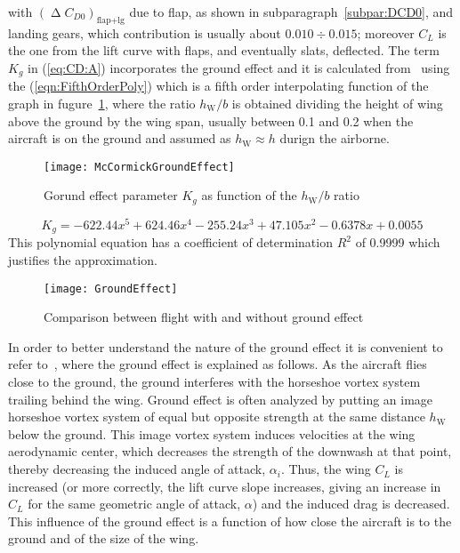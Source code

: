%
with $\left(\upDelta C_{D0}\right)_{\text{flap}+\text{lg}}$ due to flap, as shown in subparagraph~\ref{subpar:DCD0}, and landing gears, which contribution is usually about $0.010 \div 0.015$; moreover $C_L$ is the one from the lift curve with flaps, and eventually slats, deflected. The term $K_g$ in (\ref{eq:CD:A}) incorporates the ground effect and it is calculated from~\cite{McCormick} using the (\ref{eqn:FifthOrderPoly}) which is a fifth order interpolating function of the  graph in fugure~\ref{fig:McCormickGroundEffect}, where the ratio $h_{\text{W}}/b$ is obtained dividing the height of wing above the ground by the wing span, usually between 0.1 and 0.2 when the aircraft is on the ground and assumed as $h_{\text{W}} \approx h$ durign the airborne.
%
\begin{figure}[H]
\centering
\texttt{[image: McCormickGroundEffect]}
\caption{Gorund effect parameter $K_g$ as function of the $h_{\text{W}}/b$ ratio}
\label{fig:McCormickGroundEffect}
\end{figure}
%
\begin{equation}
K_g=-622.44x^5+624.46x^4-255.24x^3+47.105x^2-0.6378x+0.0055
\label{eqn:FifthOrderPoly}
\end{equation}
%
This polynomial equation has a coefficient of determination $R^2$ of 0.9999 which justifies the approximation.
%
\begin{figure}[!t]
\centering
\texttt{[image: GroundEffect]}
\caption{Comparison between flight with and without ground effect}
\label{fig:GroundEffect}
\end{figure}

\bigskip
\noindent
In order to better understand the nature of the ground effect it is convenient to refer to~\cite{nicolai2010fundamentals}, where the ground effect is explained as follows.
%
As the aircraft flies close to the ground, the ground interferes with the horseshoe vortex system trailing behind the wing. Ground effect is often analyzed by putting an image horseshoe vortex system of equal but opposite strength at the same distance $h_{\text{W}}$ below the ground.
%
This image vortex system induces velocities at the wing aerodynamic center, which decreases the strength of the downwash at that point, thereby decreasing the induced angle of attack, $\alpha_i$. Thus, the wing $C_L$ is increased (or more correctly, the lift curve slope increases, giving an increase in $C_L$ for the same geometric angle of attack, $\alpha$) and the induced drag is decreased.
%
This influence of the ground effect is a function of how close the aircraft is to the ground and of the size of the wing.

